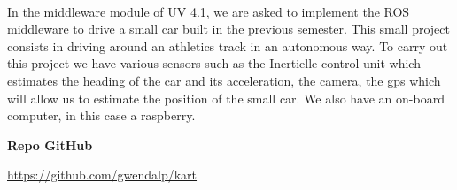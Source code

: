 \paragraph{}In the middleware module of UV 4.1, we are asked to implement the ROS middleware to drive a small car built in the previous semester. 
This small project consists in driving around an athletics track in an autonomous way. 
To carry out this project we have various sensors such as the Inertielle control unit which estimates the heading of the car and its acceleration, the camera, 
the gps which will allow us to estimate the position of the small car. We also have an on-board computer, in this case a raspberry.

\textbf{Repo GitHub}

\url{https://github.com/gwendalp/kart}

